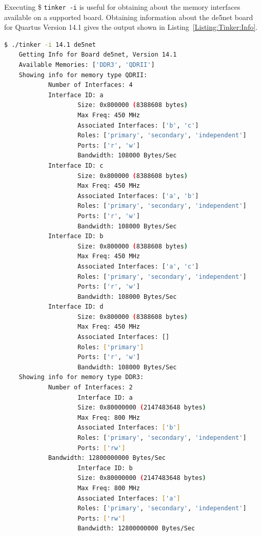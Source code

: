 \documentclass{refrep}
\newcommand{\TermCmd}[1]{\$ \texttt{#1}}
\begin{document}
Executing \TermCmd{tinker -i} is useful for obtaining about the memory
interfaces available on a supported board. Obtaining information about the
de5net board for Quartus Version 14.1 gives the output shown in
Listing~\ref{Listing:Tinker:Info}.

\begin{lstlisting}[language=bash,basicstyle=\footnotesize\ttfamily,commentstyle=\color{red},
    label=Listing:Tinker:Info,captionpos=b,
    caption=Output from running ./tinker -i 14.1 de5net in a correctly configured environment,frame=single]
  $ ./tinker -i 14.1 de5net
    Getting Info for Board de5net, Version 14.1
    Available Memories: ['DDR3', 'QDRII']
    Showing info for memory type QDRII:
            Number of Interfaces: 4
            Interface ID: a
                    Size: 0x800000 (8388608 bytes)
                    Max Freq: 450 MHz
                    Associated Interfaces: ['b', 'c']
                    Roles: ['primary', 'secondary', 'independent']
                    Ports: ['r', 'w']
                    Bandwidth: 108000 Bytes/Sec
            Interface ID: c
                    Size: 0x800000 (8388608 bytes)
                    Max Freq: 450 MHz
                    Associated Interfaces: ['a', 'b']
                    Roles: ['primary', 'secondary', 'independent']
                    Ports: ['r', 'w']
                    Bandwidth: 108000 Bytes/Sec
            Interface ID: b
                    Size: 0x800000 (8388608 bytes)
                    Max Freq: 450 MHz
                    Associated Interfaces: ['a', 'c']
                    Roles: ['primary', 'secondary', 'independent']
                    Ports: ['r', 'w']
                    Bandwidth: 108000 Bytes/Sec
            Interface ID: d
                    Size: 0x800000 (8388608 bytes)
                    Max Freq: 450 MHz
                    Associated Interfaces: []
                    Roles: ['primary']
                    Ports: ['r', 'w']
                    Bandwidth: 108000 Bytes/Sec
    Showing info for memory type DDR3:
            Number of Interfaces: 2
                    Interface ID: a
                    Size: 0x80000000 (2147483648 bytes)
                    Max Freq: 800 MHz
                    Associated Interfaces: ['b']
                    Roles: ['primary', 'secondary', 'independent']
                    Ports: ['rw']
            Bandwidth: 12800000000 Bytes/Sec
                    Interface ID: b
                    Size: 0x80000000 (2147483648 bytes)
                    Max Freq: 800 MHz
                    Associated Interfaces: ['a']
                    Roles: ['primary', 'secondary', 'independent']
                    Ports: ['rw']
                    Bandwidth: 12800000000 Bytes/Sec
  
\end{lstlisting}
\end{document}

